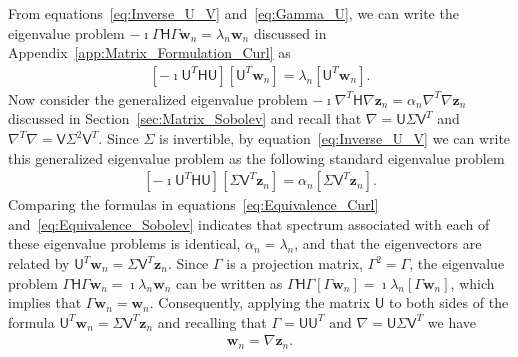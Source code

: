 \documentclass[english,12pt,jmp,graphicx]{revtex4-1}
\newcommand{\vecw}{\boldsymbol{w}}
\newcommand{\vecz}{\boldsymbol{z}}
\newcommand{\secref}[1]{Section~\ref{#1}}
\newcommand{\appref}[1]{Appendix~\ref{#1}}
\newcommand{\Hm}{\mathsf{H}}
\newcommand{\Um}{\mathsf{U}}
\newcommand{\Vm}{\mathsf{V}}
\newcommand{\Pm}{\mathsf{P}}
\begin{document}
 


From equations~\eqref{eq:Inverse_U_V} and~\eqref{eq:Gamma_U}, we
can write the eigenvalue problem $-\imath\Gamma\Hm\Gamma\vecw_n=\lambda_n\vecw_n$ discussed
in \appref{app:Matrix_Formulation_Curl} as   
%
\begin{align}\label{eq:Equivalence_Curl}
  [-\imath\Um^T\Hm\Um][\Um^T\vecw_n]=\lambda_n[\Um^T\vecw_n].
\end{align}
%
Now consider the generalized eigenvalue problem
$-\imath\nabla^T\Hm\nabla\vecz_n=\alpha_n\nabla^T\nabla\vecz_n$ discussed in
\secref{sec:Matrix_Sobolev} and recall that $\nabla=\Um\Sigma\Vm^T$ and
$\nabla^T\nabla=\Vm\Sigma^2\Vm^T$. Since 
$\Sigma$ is invertible, by equation~\eqref{eq:Inverse_U_V} we can write
this generalized eigenvalue problem as the following standard
eigenvalue problem 
%
\begin{align}\label{eq:Equivalence_Sobolev}
  [-\imath\Um^T\Hm\Um][\Sigma\Vm^T\vecz_n]=\alpha_n[\Sigma\Vm^T\vecz_n].
\end{align}
%
Comparing the formulas in equations~\eqref{eq:Equivalence_Curl} 
and~\eqref{eq:Equivalence_Sobolev} indicates that spectrum associated
with each of these eigenvalue problems is identical, $\alpha_n=\lambda_n$, and
that the eigenvectors are related by
$\Um^T\vecw_n=\Sigma\Vm^T\vecz_n$. Since $\Gamma$ is a projection matrix,
$\Gamma^2=\Gamma$, the eigenvalue problem $\Gamma\Hm\Gamma\vecw_n=\imath\lambda_n\vecw_n$ can be
written as $\Gamma\Hm\Gamma[\Gamma\vecw_n]=\imath\lambda_n[\Gamma\vecw_n]$, which implies that
$\Gamma\vecw_n=\vecw_n$.
%
Consequently, applying the matrix $\Um$ to 
both sides of the formula $\Um^T\vecw_n=\Sigma\Vm^T\vecz_n$ and recalling
that $\Gamma=\Um\Um^T$ and $\nabla=\Um\Sigma\Vm^T$ we have 
%
\begin{align}\label{eq:Evector_relation}
  \vecw_n=\nabla\vecz_n.
\end{align}
%
\end{document}
